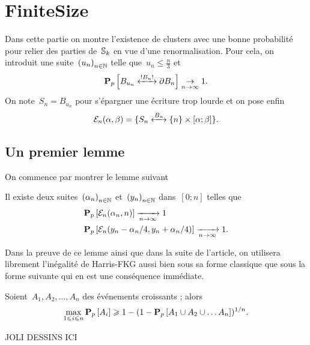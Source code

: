 \section{FiniteSize}
Dans cette partie on montre l'existence de clusters avec une bonne probabilité pour relier des parties de~$\mathbb{S}_k$ en vue d'une renormalisation. Pour cela, on introduit une suite~$\suite{u}$ telle que~$u_n \leqslant \frac{n}{3}$ et
	\[
		\Pp{\relie*[B_n]{B_{u_n}}{\partial B_n}} \underset{n \to \infty}{\to} 1.
	\] 
	On note~$S_n = B_{u_n}$ pour s'épargner une écriture trop lourde et on pose enfin
	\[
		\mathcal{E}_n( \alpha, \beta ) = \{\relie[B_n]{S_n}{\{n\} \times [ \alpha ; \beta ]} \}.
	\]
	\subsection{Un premier lemme}
		On commence par montrer le lemme suivant
		\begin{lem}\label{lem:collagesElem} 
			Il existe deux suites~$\suite{\alpha}$ et~$\suite{y}$ dans~$[0; n]$ telles que
			\begin{align*}
				  &\bm{\mathrm{P}}_{p}\left[\mathcal{E}_n(\alpha_n, n)\right] \xrightarrow[n\to\infty]{} 1 \\ 
				  &\bm{\mathrm{P}}_{p}\left[\mathcal{E}_n(y_n - \alpha_n/4, y_n + \alpha_n/4)\right] \xrightarrow[n \to \infty]{} 1.
			\end{align*}
		\end{lem}
		Dans la preuve de ce lemme ainsi que dans la suite de l'article, on utilisera librement l'inégalité de Harris-FKG aussi bien sous sa forme classique que sous la forme suivante qui en est une conséquence immédiate. %
		\begin{lem}\label{lem:HarrisFKG}
			Soient~$A_1, A_2, \ldots, A_n$ des événements croissants ; alors
			\[
				\max_{1 \leqslant i \leqslant n} \bm{\mathrm{P}}_{p}\left[A_i\right] \geqslant 1 - (1 - \bm{\mathrm{P}}_{p}\left[A_1 \cup A_2 \cup \ldots A_n\right])^{1/n}. 
			\]
		\end{lem}
		
		JOLI DESSINS ICI %

